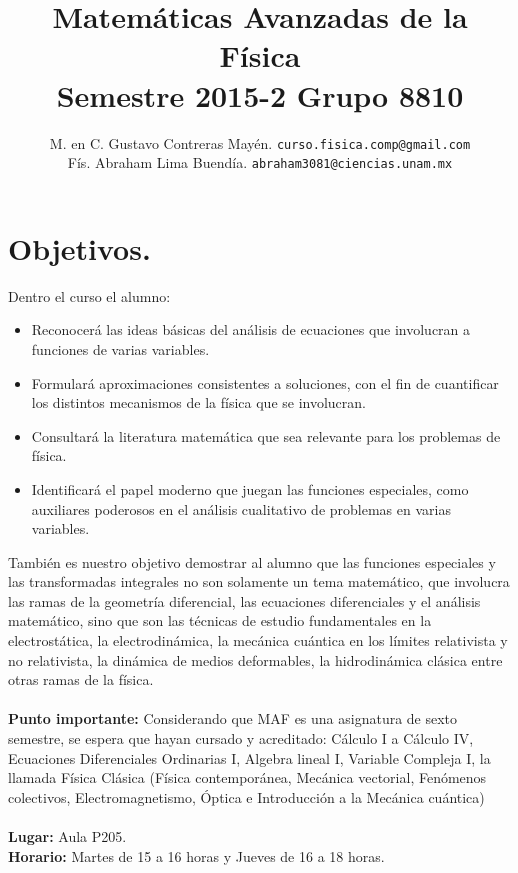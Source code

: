 \documentclass[12pt]{article}
\author{M. en C. Gustavo Contreras Mayén. \texttt{curso.fisica.comp@gmail.com}\\
Fís. Abraham Lima Buendía. \texttt{abraham3081@ciencias.unam.mx}}
\title{Matemáticas Avanzadas de la Física \\ {\large Semestre 2015-2 Grupo 8810}}
\date{ }
\begin{document}
\renewcommand\labelenumii{\theenumi.{\arabic{enumii}}}
\maketitle
\fontsize{12}{12}\selectfont
\section{Objetivos.}
Dentro el curso el alumno:
\begin{itemize}
\setlength{\itemsep}{0mm}
\item Reconocerá las ideas básicas del análisis de ecuaciones que involucran a funciones de varias variables.
\item Formulará aproximaciones consistentes a soluciones, con el fin de cuantificar los distintos mecanismos de la física que se involucran.
\item Consultará la literatura matemática que sea relevante para los problemas de física.
\item Identificará el papel moderno que juegan las funciones especiales, como auxiliares poderosos en el análisis cualitativo de problemas en varias variables.
\end{itemize}
También es nuestro objetivo demostrar al alumno que las funciones especiales y las transformadas integrales no son solamente un tema matemático, que involucra las ramas de la geometría diferencial, las ecuaciones diferenciales y el análisis matemático, sino que son las técnicas de estudio fundamentales en la electrostática, la electrodinámica, la mecánica cuántica en los límites relativista y  no relativista, la dinámica de medios deformables, la hidrodinámica clásica entre otras ramas de la física.
\\
\\
\textbf{Punto importante: } Considerando que MAF es una asignatura de sexto semestre, se espera que hayan cursado y acreditado: Cálculo I a Cálculo IV, Ecuaciones Diferenciales Ordinarias I, Algebra lineal I, Variable Compleja I, la llamada Física Clásica (Física contemporánea, Mecánica vectorial, Fenómenos colectivos, Electromagnetismo, Óptica e Introducción a la Mecánica cuántica)
\\
\\
\textbf{Lugar: }Aula P205.
\\
\textbf{Horario: } Martes de 15 a 16 horas y Jueves de 16 a 18 horas.
\end{document}
